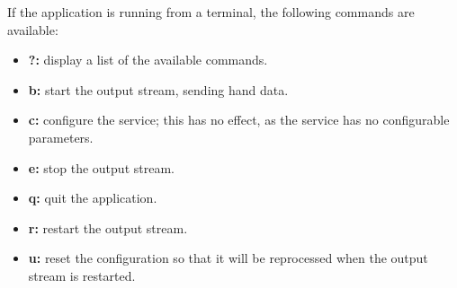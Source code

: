 If the application is running from a terminal, the following commands are available:
\begin{itemize}
\item \textbf{?:} display a list of the available commands.
\item \textbf{b:} start the output stream, sending hand data. 
\item \textbf{c:} configure the service; this has no effect, as the service has no
configurable parameters. 
\item \textbf{e:} stop the output stream. 
\item \textbf{q:} quit the application. 
\item \textbf{r:} restart the output stream. 
\item \textbf{u:} reset the configuration so that it will be reprocessed when the output
stream is restarted. 
\end{itemize}
\primaryEnd{}
